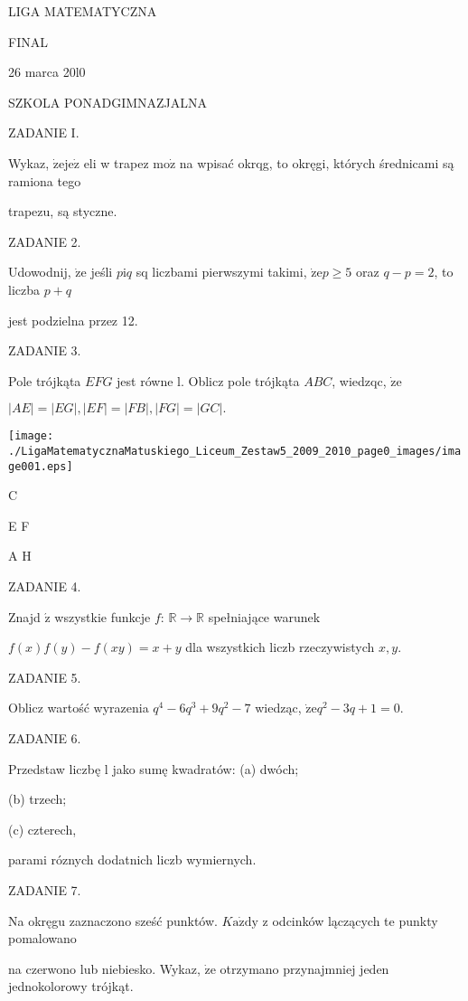 \documentclass[a4paper,12pt]{article}
\begin{document}
LIGA MATEMATYCZNA

FINAL

26 marca 20l0

SZKOLA PONADGIMNAZJALNA

ZADANIE I.

Wykaz, $\dot{\mathrm{z}}\mathrm{e}\mathrm{j}\mathrm{e}\dot{\mathrm{z}}$ eli w trapez $\mathrm{m}\mathrm{o}\dot{\mathrm{z}}$ na wpisać okrqg, to okręgi, których średnicami są ramiona tego

trapezu, są styczne.

ZADANIE 2.

Udowodnij, $\dot{\mathrm{z}}\mathrm{e}$ jeśli $p\mathrm{i}q$ sq liczbami pierwszymi takimi, $\dot{\mathrm{z}}\mathrm{e}p\geq 5$ oraz $q-p=2$, to liczba $p+q$

jest podzielna przez 12.

ZADANIE 3.

Pole trójkąta $EFG$ jest równe l. Oblicz pole trójkąta $ABC$, wiedzqc, $\dot{\mathrm{z}}\mathrm{e}$

$|AE|=|EG|,|EF|=|FB|,|FG|=|GC|.$
\begin{center}
\texttt{[image: ./LigaMatematycznaMatuskiego\_Liceum\_Zestaw5\_2009\_2010\_page0\_images/image001.eps]}
\end{center}
C

E  F

A  H

ZADANIE 4.

Znajd $\acute{\mathrm{z}}$ wszystkie funkcje $f$: $\mathbb{R}\rightarrow \mathbb{R}$ spełniające warunek

$f(x)f(y)-f(xy)=x+y$ dla wszystkich liczb rzeczywistych $x, y.$

ZADANIE 5.

Oblicz wartość wyrazenia $q^{4}-6q^{3}+9q^{2}-7$ wiedząc, $\dot{\mathrm{z}}\mathrm{e}q^{2}-3q+1=0.$

ZADANIE 6.

Przedstaw liczbę l jako sumę kwadratów: (a) dwóch;

(b) trzech;

(c) czterech,

parami róznych dodatnich liczb wymiernych.

ZADANIE 7.

Na okręgu zaznaczono sześć punktów. $K\mathrm{a}\dot{\mathrm{z}}\mathrm{d}\mathrm{y}$ z odcinków lączących te punkty pomalowano

na czerwono lub niebiesko. Wykaz, $\dot{\mathrm{z}}\mathrm{e}$ otrzymano przynajmniej jeden jednokolorowy trójkąt.
\end{document}
